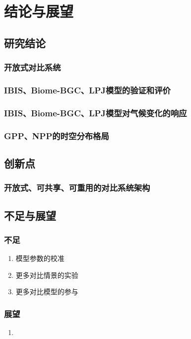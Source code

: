 \chapter{结论与展望}

\section{研究结论}
\subsection{开放式对比系统}
\subsection{IBIS、Biome-BGC、LPJ模型的验证和评价}
\subsection{IBIS、Biome-BGC、LPJ模型对气候变化的响应}
\subsection{GPP、NPP的时空分布格局}

\section{创新点}
\subsection{开放式、可共享、可重用的对比系统架构}

\section{不足与展望}
\subsection{不足}
\begin{enumerate}[(1)]
    \item 模型参数的校准
    \item 更多对比情景的实验
    \item 更多对比模型的参与
\end{enumerate}

\subsection{展望}
\begin{enumerate}[(1)]
    \item 
\end{enumerate}